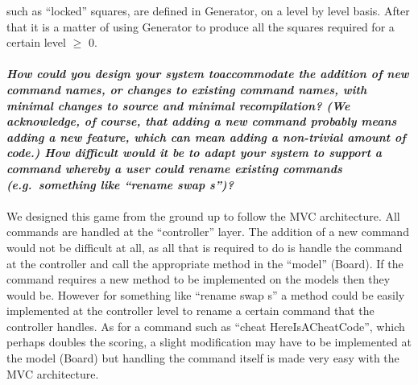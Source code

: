 \documentclass{report}
\begin{document}
such as ``locked'' squares, are defined in Generator, on a level by level basis. After that
it is a matter of using Generator to produce all the squares required for a certain level
$\geq$ 0.\\
\\
\textbf{\textit{How could you design your system toaccommodate the addition of new command names, or changes to existing command names, with minimal changes to source and minimal recompilation? (We acknowledge, of course, that adding a new command probably means adding a new feature, which can mean adding a non-trivial amount of code.) How difficult would it be to adapt your system to support a command whereby a user could rename existing commands (e.g.\ something like ``rename swap s'')?}}\\
\\
We designed this game from the ground up to follow the MVC architecture. All commands are 
handled at the ``controller'' layer. The addition of a new command would not be difficult
at all, as all that is required to do is handle the command at the controller and call the
appropriate method in the ``model'' (Board). If the command requires a new method to be
implemented on the models then they would be. However for something like ``rename swap s''
a method could be easily implemented at the controller level to rename a certain command
that the controller handles. As for a command such as ``cheat HereIsACheatCode'',
which perhaps doubles the scoring, a slight modification may have to be implemented at
the model (Board) but handling the command itself is made very easy with the MVC architecture.
\end{document}

